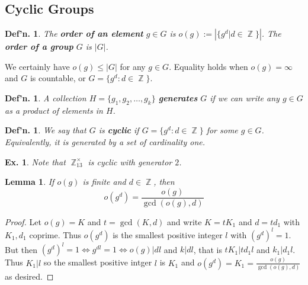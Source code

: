 \documentclass[12pt, a4paper]{book}
\DeclareMathOperator{\Z}{\mathbb{Z}}
\newtheorem{lemma}[theorem]{Lemma}
\newtheorem{definition}[theorem]{Def'n.}
\newtheorem{example}[theorem]{Ex.}
\theoremstyle{nonumberplain}
\newtheorem{proof}{Proof}
\begin{document}
\subsection{Cyclic Groups}
\begin{definition}
    The \textbf{order of an element} $g\in G$ is $o(g):=\left\lvert\{g^d|d\in\Z\}\right\rvert$.
    The \textbf{order of a group} $G$ is $|G|$.
\end{definition}
We certainly have $o(g)\leq|G|$ for any $g\in G$.
Equality holds when $o(g)=\infty$ and $G$ is countable, or $G=\{g^d:d\in\Z\}$.
\begin{definition}
    A collection $H=\{g_1,g_2,\ldots,g_k\}$ \textbf{generates} $G$ if we can write any $g\in G$ as a product of elements in $H$.
\end{definition}
\begin{definition}
    We say that $G$ is \textbf{cyclic} if $G=\{g^d:d\in\Z\}$ for some $g\in G$.
    Equivalently, it is generated by a set of cardinality one.
\end{definition}
\begin{example}
    Note that $\Z_{13}^\times$ is cyclic with generator $2$.
\end{example}
\begin{lemma}
    If $o(g)$ is finite and $d\in\Z$, then
    \[o(g^d)=\frac{o(g)}{\gcd(o(g),d)}\]
\end{lemma}
\begin{proof}
    Let $o(g)=K$ and $t=\gcd(K,d)$ and write $K=tK_1$ and $d=td_1$ with $K_1,d_1$ coprime.
    Thus $o(g^d)$ is the smallest positive integer $l$ with $(g^d)^l=1$.
    But then $(g^d)^l=1\Leftrightarrow g^{dl}=1\Leftrightarrow o(g)|dl$ and $k|dl$, that is $tK_1|td_1l$ and $k_1|d_1l$.
    Thus $K_1|l$ so the smallest positive intger $l$ is $K_1$ and $o(g^d)=K_1=\frac{o(g)}{\gcd(o(g),d)}$ as desired.
\end{proof}
\end{document}
